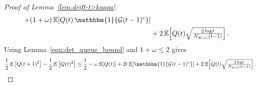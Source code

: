 \documentclass[12pt,draftcls, onecolumn]{IEEEtran}
\newcommand{\vedisc}{\omega}
\begin{document}
{\begin{proof}[Proof of Lemma~\ref{lem:drift-t>kappa}]
\begin{align}
+(1+\vedisc)\,\mathbb{E}\!\left[Q(t)\,\mathbbm{1}\{\mathcal{G}(t-1)^c\}\right]
\nonumber\\&+2\,\mathbb{E}\!\left[Q(t)\sqrt{\tfrac{2\log\!t}{N_{K(t)}(t-1)}}\right]. \nonumber
\end{align}
Using Lemma~\ref{eqn:det_queue_bound} and \(1+\vedisc\le 2\) gives
\[
\frac{1}{2}\,\mathbb{E}\left[Q(t+1)^2\right]
- \frac{1}{2}\,\mathbb{E}\left[Q(t)^2\right]
\le \frac{1}{2}
-\vedisc\,\mathbb{E}[Q(t)]
+2 t\,\mathbb{E}\!\left[\mathbbm{1}\{\mathcal{G}(t-1)^c\}\right]
+2\,\mathbb{E}\!\left[Q(t)\sqrt{\tfrac{2\log\!t}{N_{K(t)}(t-1)}}\right].
\]




\end{proof}}
\end{document}
